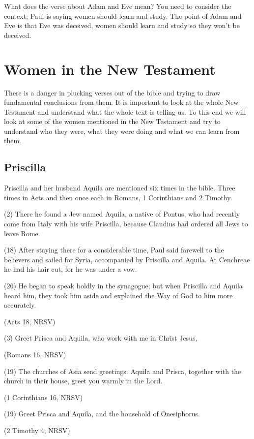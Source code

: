 \documentclass[a5paper, openany, oneside, pagesize,
headings=standardclasses, chapterprefix=false]{scrbook}
\begin{document}
What does the verse about Adam and Eve mean? You need to consider the
context; Paul is saying women should learn and study. The point of
Adam and Eve is that Eve was deceived, women should learn and study so
they won't be deceived.

\chapter{Women in the New Testament}

There is a danger in plucking verses out of the bible and trying to
draw fundamental conclusions from them. It is important to look at the
whole New Testament and understand what the whole text is telling us.
To this end we will look at some of the women mentioned in the New
Testament and try to understand who they were, what they were doing
and what we can learn from them.

\section{Priscilla}

Priscilla and her husband Aquila are mentioned six times in the bible.
Three times in Acts and then once each in Romans, 1 Corinthians and 2
Timothy.

\begin{myquote}
(2) There he found a Jew named Aquila, a native of Pontus, who had
recently come from Italy with his wife Priscilla, because Claudius had
ordered all Jews to leave Rome.

(18) After staying there for a considerable time, Paul said farewell to
the believers and sailed for Syria, accompanied by Priscilla and
Aquila. At Cenchreae he had his hair cut, for he was under a vow.

(26) He began to speak boldly in the synagogue; but when Priscilla and Aquila heard him, they took him aside and explained the Way of God to him more accurately.

(Acts 18, NRSV)
\end{myquote}


\begin{myquote}
(3) Greet Prisca and Aquila, who work with me in Christ Jesus,

(Romans 16, NRSV)


(19) The churches of Asia send greetings. Aquila and Prisca, together with the church in their house, greet you warmly in the Lord.

(1 Corinthians 16, NRSV)

(19) Greet Prisca and Aquila, and the household of Onesiphorus.

(2 Timothy 4, NRSV)
\end{myquote}
\end{document}

